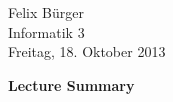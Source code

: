 \documentclass[parskip=full]{scrartcl}
\begin{document}
Felix Bürger\\
Informatik 3\\
Freitag, 18. Oktober 2013

\Huge\textbf{Lecture Summary}

\doublespacing
\normalsize

\lipsum[1]

\lipsum[2]
\end{document}
